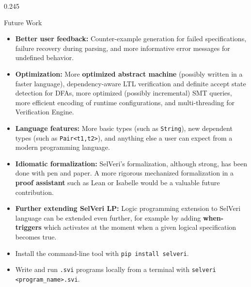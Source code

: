 \documentclass[final]{beamer}
\newcommand{\posterbodyfont}{\fontsize{24}{31}\selectfont}
\begin{document}
\begin{frame}[t,fragile]
\begin{columns}[t,totalwidth=\textwidth]
\begin{column}{0.245\textwidth}

\begin{posterbox}[height=25.1cm,compactboxtitle]{Future Work}
{\posterbodyfont
\begin{itemize}
  \item \textbf{Better user feedback:} Counter-example generation for failed specifications, failure recovery during parsing, and more informative error messages for undefined behavior.

  \item \textbf{Optimization:} More \textbf{optimized abstract machine} (possibly written in a faster language), dependency-aware LTL verification and definite accept state detection for DFAs, more optimized (possibly incremental) SMT queries, more efficient encoding of runtime configurations, and multi-threading for Verification Engine.

  \item \textbf{Language features:} More basic types (such as \texttt{String}), new dependent types (such as \texttt{Pair<t1,t2>}), and anything else a user can expect from a modern programming language.

  \item \textbf{Idiomatic formalization:} SelVeri's formalization, although strong, has been done with pen and paper. A more rigorous mechanized formalization in a \textbf{proof assistant} such as Lean or Isabelle would be a valuable future contribution. 

  \item \textbf{Further extending SelVeri LP:} Logic programming extension to SelVeri language can be extended even further, for example by adding \textbf{when-triggers} which activates at the moment when a given logical specification becomes true.
\end{itemize}
}
\end{posterbox}

\vspace{0.25cm}

\begin{posterbox}[height=17.4cm,compactboxtitle]{}
{\posterbodyfont
\begin{itemize}
  \item Install the command-line tool with \texttt{pip install selveri}.

  \item Write and run \texttt{.svi} programs locally from a terminal with \texttt{selveri <program\_name>.svi}.
  

\end{itemize}}
\end{posterbox}
\end{column}
\end{columns}
\end{frame}
\end{document}
